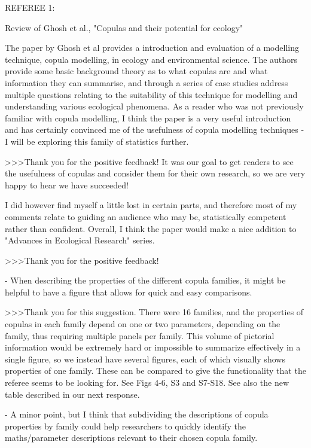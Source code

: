 

REFEREE 1:

Review of Ghosh et al., "Copulas and their potential for ecology"

The paper by Ghosh et al provides a introduction and evaluation of a modelling technique,
copula modelling, in ecology and environmental science. The authors provide some basic
background theory as to what copulas are and what information they can summarise, and through
a series of case studies address multiple questions relating to the suitability of this technique
for modelling and understanding various ecological phenomena. As a reader who was not previously
familiar with copula modelling, I think the paper is a very useful introduction and has certainly
convinced me of the usefulness of copula modelling techniques - I will be exploring this family
of statistics further.

>>>Thank you for the positive feedback! It was our goal to get readers to see the usefulness of
copulas and consider them for their own research, so we are very happy to hear we have succeeded!

I did however find myself a little lost in certain parts, and therefore most of my comments relate
to guiding an audience who may be, statistically competent rather than confident. Overall, I
think the paper would make a nice addition to "Advances in Ecological Research" series.

>>>Thank you for the positive feedback!

- When describing the properties of the different copula families, it might be helpful to have a
figure that allows for quick and easy comparisons.

>>>Thank you for this suggestion. There were 16 families, and the properties
of copulas in each family depend on one or two parameters, depending on the
family, thus requiring multiple panels per family. This volume of pictorial
information would be extremely hard or impossible to summarize effectively in a
single figure, so we instead have several figures, each of which visually
shows properties of one family. These can be compared to give the functionality that
the referee seems to be looking for. See Figs 4-6, S3 and S7-S18. See also the new
table described in our next response.

- A minor point, but I think that subdividing the descriptions of copula properties by family could
help researchers to quickly identify the maths/parameter descriptions relevant to their chosen copula
family.

